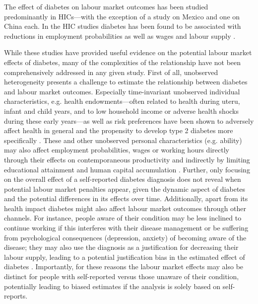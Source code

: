 The effect of diabetes on labour market outcomes has been studied predominantly in \acp{HIC}---with the exception of a study on Mexico \autocite{Seuring2015} and one on China \parencite{Liu2014} each. In the \ac{HIC} studies diabetes has been found to be associated with reductions in employment probabilities as well as wages and labour supply \parencite{Brown2005,Brown2014,BrownIII2011,Minor2011,Minor2013,Minor2015,Latif2009,Seuring2015a}.

While these studies have provided useful evidence on the potential labour market effects of diabetes, many of the complexities of the relationship have not been comprehensively addressed in any given study. First of all, unobserved heterogeneity presents a challenge to estimate the relationship between diabetes and labour market outcomes. Especially time-invariant unobserved individual characteristics, e.g. health endowments---often related to health during uteru, infant and child years, and to low household income or adverse health shocks during these early years---as well as risk preferences have been shown to adversely affect health in general and the propensity to develop type 2 diabetes more specifically \parencite{VanEwijk2011,Sotomayor2013,Li2010b}. These and other unobserved personal characteristics (e.g. ability) may also affect employment probabilities, wages or working hours directly through their effects on contemporaneous productivity \parencite{Currie2013} and indirectly by limiting educational attainment and human capital accumulation \parencite{Ayyagari2011a}. Further, only focusing on the overall effect of a self-reported diabetes diagnosis does not reveal when potential labour market penalties appear, given the dynamic aspect of diabetes and the potential differences in its effects over time. Additionally, apart from its health impact diabetes might also affect labour market outcomes through other channels. For instance, people aware of their condition may be less inclined to continue working if this interferes with their disease management or be suffering from psychological consequences (depression, anxiety) of becoming aware of the disease; they may also use the diagnosis as a justification for decreasing their labour supply, leading to a potential justification bias in the estimated effect of diabetes \parencite{Kapteyn2009}. Importantly, for these reasons the labour market effects may also be distinct for people with self-reported versus those unaware of their condition, potentially leading to biased estimates if the analysis is solely based on self-reports.

